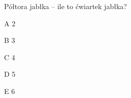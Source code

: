\begin{tresc}
Półtora jabłka – ile to ćwiartek jabłka?
\end{tresc}
\begin{wariant}{A} 2 \end{wariant}
\begin{wariant}{B} 3 \end{wariant}
\begin{wariant}{C} 4 \end{wariant}
\begin{wariant}{D} 5 \end{wariant}
\begin{wariant}{E} 6 \end{wariant}
